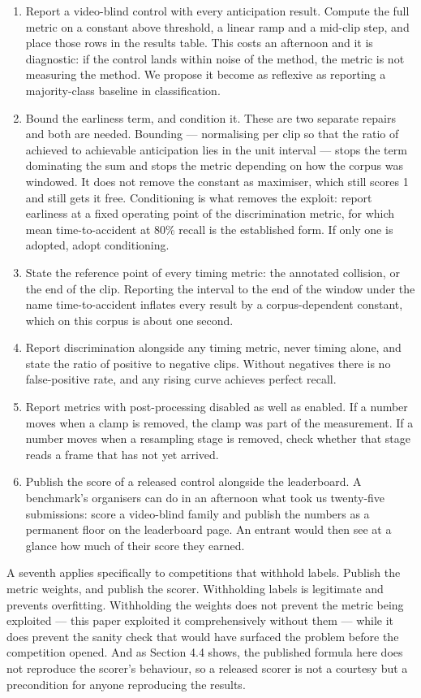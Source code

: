 \begin{enumerate}
\item
  Report a video-blind control with every anticipation result. Compute the full metric on a constant above threshold, a linear ramp and a mid-clip step, and place those rows in the results table. This costs an afternoon and it is diagnostic: if the control lands within noise of the method, the metric is not measuring the method. We propose it become as reflexive as reporting a majority-class baseline in classification.
\item
  Bound the earliness term, and condition it. These are two separate repairs and both are needed. Bounding --- normalising per clip so that the ratio of achieved to achievable anticipation lies in the unit interval --- stops the term dominating the sum and stops the metric depending on how the corpus was windowed. It does not remove the constant as maximiser, which still scores 1 and still gets it free. Conditioning is what removes the exploit: report earliness at a fixed operating point of the discrimination metric, for which mean time-to-accident at 80\% recall is the established form. If only one is adopted, adopt conditioning.
\item
  State the reference point of every timing metric: the annotated collision, or the end of the clip. Reporting the interval to the end of the window under the name time-to-accident inflates every result by a corpus-dependent constant, which on this corpus is about one second.
\item
  Report discrimination alongside any timing metric, never timing alone, and state the ratio of positive to negative clips. Without negatives there is no false-positive rate, and any rising curve achieves perfect recall.
\item
  Report metrics with post-processing disabled as well as enabled. If a number moves when a clamp is removed, the clamp was part of the measurement. If a number moves when a resampling stage is removed, check whether that stage reads a frame that has not yet arrived.
\item
  Publish the score of a released control alongside the leaderboard. A benchmark's organisers can do in an afternoon what took us twenty-five submissions: score a video-blind family and publish the numbers as a permanent floor on the leaderboard page. An entrant would then see at a glance how much of their score they earned.
\end{enumerate}

A seventh applies specifically to competitions that withhold labels. Publish the metric weights, and publish the scorer. Withholding labels is legitimate and prevents overfitting. Withholding the weights does not prevent the metric being exploited --- this paper exploited it comprehensively without them --- while it does prevent the sanity check that would have surfaced the problem before the competition opened. And as Section 4.4 shows, the published formula here does not reproduce the scorer's behaviour, so a released scorer is not a courtesy but a precondition for anyone reproducing the results.


